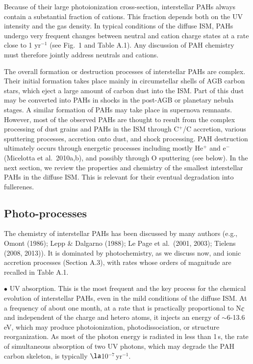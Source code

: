 \documentclass{aa}
\begin{document}
Because of their large photoionization cross-section,  interstellar  PAHs always contain a substantial fraction of cations. This fraction depends both on the UV intensity and the gas density. In typical conditions of the diffuse 
ISM, PAHs undergo very frequent changes between neutral and cation charge 
states at a rate close to 1 yr$^{-1}$ (see Fig.\ 1 and Table A.1). Any discussion of PAH chemistry must therefore jointly address neutrals and cations.

The overall formation or destruction processes of interstellar PAHs are complex. Their initial formation  takes place mainly in circumstellar shells of AGB carbon stars, which eject a large amount of carbon dust into the ISM. 
Part of this dust may be converted into PAHs in shocks in the post-AGB or 
planetary nebula stages. A similar formation of PAHs may take place in supernova remnants. However, most of the observed PAHs are thought to result from the complex processing of dust grains and PAHs in the ISM through C$^+$/C accretion, various sputtering processes, accretion onto dust, and shock processing. 
PAH destruction  ultimately occurs through  energetic processes including 
mostly He$^+$ and e$^-$  (Micelotta et al.\ 2010a,b), and possibly through O sputtering (see below). In the next section, we review the properties and chemistry of the smallest interstellar PAHs  in the diffuse ISM. This is relevant for their eventual degradation into fullerenes.

\subsection{Photo-processes}

The chemistry of interstellar PAHs has been discussed by many authors (e.g., Omont (1986); Lepp \& Dalgarno (1988); Le Page et al.\ (2001, 2003); Tielens (2008, 2013)). It is dominated by photochemistry, as we discuss now, and ionic accretion processes (Section A.3), with rates whose orders of magnitude are recalled in Table A.1.

$\bullet$ UV absorption. This is the most frequent and the key process for the chemical evolution of interstellar PAHs, even in the mild conditions of 
the diffuse ISM. At a frequency of about one month, at a rate that is practically proportional to N$_{\rm C}$ and independent of the charge and hetero atoms, it injects an energy of $\sim$6-13.6\,eV, which may produce photoionization, photodissociation, or structure reorganization. As most of the photon energy is radiated in less than 1\,s, the rate of simultaneous absorption of two 
UV photons, which may degrade the PAH carbon skeleton, is typically $\la$10$^{-7}$\,yr$^{-1}$.
\end{document}
